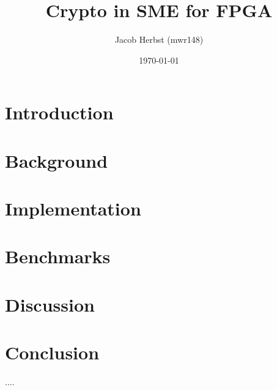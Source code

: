 \documentclass[a4paper]{article}
\author{Jacob Herbst (mwr148)}
\date{\today}
\title{Crypto in SME for FPGA}
\begin{document}
\maketitle
\tableofcontents


\section{Introduction}
\label{sec:org5893250}

\section{Background}
\label{sec:org431d760}

\section{Implementation}
\label{sec:org34470a0}

\section{Benchmarks}
\label{sec:orga600e89}

\section{Discussion}
\label{sec:org818a79b}

\section{Conclusion}
\label{sec:orgaba444b}




\begin{appendix}

....

\end{appendix}
\end{document}
